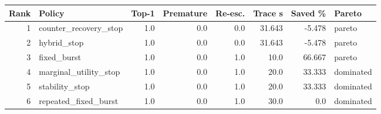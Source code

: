 \begin{tabular}{rlrrrrrl}
\hline
Rank & Policy & Top-1 & Premature & Re-esc. & Trace s & Saved \% & Pareto \\
\hline
1 & counter_recovery_stop & 1.0 & 0.0 & 0.0 & 31.643 & -5.478 & pareto \\
2 & hybrid_stop & 1.0 & 0.0 & 0.0 & 31.643 & -5.478 & pareto \\
3 & fixed_burst & 1.0 & 0.0 & 1.0 & 10.0 & 66.667 & pareto \\
4 & marginal_utility_stop & 1.0 & 0.0 & 1.0 & 20.0 & 33.333 & dominated \\
5 & stability_stop & 1.0 & 0.0 & 1.0 & 20.0 & 33.333 & dominated \\
6 & repeated_fixed_burst & 1.0 & 0.0 & 1.0 & 30.0 & 0.0 & dominated \\
\hline
\end{tabular}
